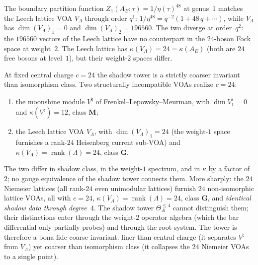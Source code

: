 \begin{remark}
\label{rem:leech-connection}
The boundary partition function
$Z_1(A_E;\tau) = 1/\eta(\tau)^{48}$ at genus~$1$ matches the
Leech lattice VOA $V_\Lambda$ through order $q^1$:
$1/\eta^{48} = q^{-2}(1 + 48\,q + \cdots)$, while
$V_\Lambda$ has $\dim (V_\Lambda)_1 = 0$ and
$\dim (V_\Lambda)_2 = 196560$. The two diverge at
order~$q^2$: the $196560$ vectors of the Leech lattice have
no counterpart in the $24$-boson Fock space
at weight~$2$.
The Leech lattice has $\kappa(V_\Lambda) = 24 = \kappa(A_E)$
\textup{(}both are $24$ free bosons at level~$1$\textup{)},
but their weight-$2$ spaces differ.
\end{remark}

\begin{remark}[The $\kappa$-collapse at $c = 24$: moonshine versus Leech]
\label{rem:kappa-collapse-moonshine}
At fixed central charge $c = 24$ the shadow tower is a
strictly coarser invariant than isomorphism class. Two
structurally incompatible VOAs realize $c = 24$:
\begin{enumerate}[label=\textup{(\roman*)}]
\item the moonshine module $V^\natural$ of
 Frenkel--Lepowsky--Meurman, with $\dim V^\natural_1 = 0$ and
 $\kappa(V^\natural) = 12$, class $\mathbf{M}$;
\item the Leech lattice VOA $V_\Lambda$, with
 $\dim (V_\Lambda)_1 = 24$ (the weight-$1$ space furnishes
 a rank-$24$ Heisenberg current sub-VOA) and
 $\kappa(V_\Lambda) = \operatorname{rank}(\Lambda) = 24$,
 class $\mathbf{G}$.
\end{enumerate}
The two differ in shadow class, in the weight-$1$ spectrum,
and in $\kappa$ by a factor of $2$; no gauge equivalence
of the shadow tower connects them. More sharply: the $24$
Niemeier lattices (all rank-$24$ even unimodular lattices)
furnish $24$ non-isomorphic lattice VOAs, all with
$c = 24$, $\kappa(V_\Lambda) = \operatorname{rank}(\Lambda) = 24$,
class $\mathbf{G}$, and
\emph{identical shadow data through degree~$4$}. The shadow
tower $\Theta_A^{\leq 4}$ cannot distinguish them; their
distinctions enter through the weight-$2$ operator algebra
(which the bar differential only partially probes) and
through the root system. The tower is therefore a
bona fide coarse invariant: finer than central charge
(it separates $V^\natural$ from $V_\Lambda$) yet coarser
than isomorphism class (it collapses the $24$ Niemeier VOAs
to a single point).
\end{remark}


